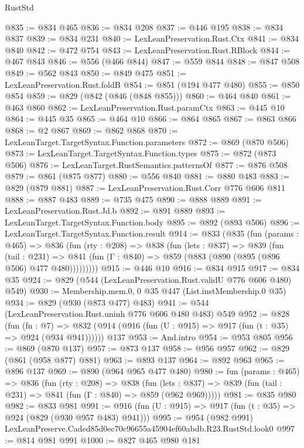\begin{lexlean}{RustStd}
\begin{coremodule}
@835 := @834 @465
@836 := @834 @208
@837 := @446 @195
@838 := @834 @837
@839 := @834 @231
@840 := LexLeanPreservation.Rust.Ctx
@841 := @834 @840
@842 := @472 @754
@843 := LexLeanPreservation.Rust.RBlock
@844 := @467 @843
@846 := @556 (@466 @844)
@847 := @559 @844
@848 := @847 @508
@849 := @562 @843
@850 := @849 @475
@851 := LexLeanPreservation.Rust.foldB
@854 := @851 (@194 @477 @480)
@855 := @850 @854
@859 := @829 (@842 (@846 (@848 @855)))
@860 := @464 @840
@861 := @463 @860
@862 := LexLeanPreservation.Rust.paramCtx
@863 := @445 @10
@864 := @445 @35
@865 := @464 @10
@866 := @864 @865
@867 := @863 @866
@868 := @2 @867
@869 := @862 @868
@870 := LexLeanTarget.TargetSyntax.Function.parameters
@872 := @869 (@870 @506)
@873 := LexLeanTarget.TargetSyntax.Function.types
@875 := @872 (@873 @506)
@876 := LexLeanTarget.RustSemantics.patternsOf
@877 := @876 @508
@879 := @861 (@875 @877)
@880 := @556 @840
@881 := @880 @483
@883 := @829 (@879 @881)
@887 := LexLeanPreservation.Rust.Corr @776 @606 @811
@888 := @887 @483
@889 := @735 @475
@890 := @888 @889
@891 := LexLeanPreservation.Rust.Jd.b
@892 := @891 @889
@893 := LexLeanTarget.TargetSyntax.Function.body
@895 := @892 (@893 @506)
@896 := LexLeanTarget.TargetSyntax.Function.result
@914 := @833
    (@835
      (fun (params : @465) =>
      @836
        (fun (rty : @208) =>
        @838
          (fun (lets : @837) =>
          @839
            (fun (tail : @231) =>
            @841 (fun (Γ : @840) => @859 (@883 (@890 (@895 (@896 @506) @477 @480)))))))))
@915 := @446 @10
@916 := @834 @915
@917 := @834 @35
@924 := @829 (@544 (LexLeanPreservation.Rust.validU @776 @606 @480) @549)
@930 := Membership.mem.{0, 0} @35 @447 (List.instMembership.{0} @35)
@934 := @829 (@930 (@873 @477) @483)
@941 := @544 (LexLeanPreservation.Rust.uninh @776 @606 @480 @483) @549
@952 := @828
    (fun (fn : @7) =>
    @832 (@914 (@916 (fun (U : @915) => @917 (fun (t : @35) => @924 (@934 @941))))))
    @137
@953 := And.intro
@954 := @953 @805
@956 := @869 (@870 @137)
@957 := @873 @137
@958 := @956 @957
@962 := @829 (@861 (@958 @877) @881)
@963 := @893 @137
@964 := @892 @963
@965 := @896 @137
@969 := @890 (@964 @965 @477 @480)
@980 := fun (params : @465) =>
  @836
    (fun (rty : @208) =>
    @838
      (fun (lets : @837) => @839 (fun (tail : @231) => @841 (fun (Γ : @840) => @859 (@962 @969)))))
@981 := @835 @980
@982 := @833 @981
@991 := @916 (fun (U : @915) => @917 (fun (t : @35) => @924 (@829 (@930 @957 @483) @941)))
@995 := @954 (@982 @991) LexLeanPreserve.Caded85d0ec70c96655a45904ef60abdb.R23.RustStd.look0
@997 := @814 @981 @991
@1000 := @827 @465 @980 @181

\end{coremodule}
\end{lexlean}

